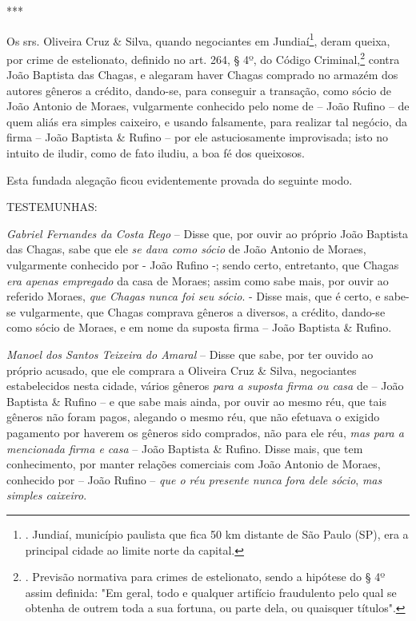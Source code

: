 ***

Os srs. Oliveira Cruz \& Silva, quando negociantes em Jundiaí\footnote{.
  Jundiaí, município paulista que fica 50 km distante de São Paulo (SP),
  era a principal cidade ao limite norte da capital.}, deram queixa, por
crime de estelionato, definido no art. 264, § 4º, do Código
Criminal,\footnote{. Previsão normativa para crimes de estelionato,
  sendo a hipótese do § 4º assim definida: "Em geral, todo e qualquer
  artifício fraudulento pelo qual se obtenha de outrem toda a sua
  fortuna, ou parte dela, ou quaisquer títulos".} contra João Baptista
das Chagas, e alegaram haver Chagas comprado no armazém dos autores
gêneros a crédito, dando-se, para conseguir a transação, como sócio de
João Antonio de Moraes, vulgarmente conhecido pelo nome de -- João
Rufino -- de quem aliás era simples caixeiro, e usando falsamente, para
realizar tal negócio, da firma -- João Baptista \& Rufino -- por ele
astuciosamente improvisada; isto no intuito de iludir, como de fato
iludiu, a boa fé dos queixosos.

Esta fundada alegação ficou evidentemente provada do seguinte modo.

TESTEMUNHAS:

\emph{Gabriel Fernandes da Costa Rego} -- Disse que, por ouvir ao
próprio João Baptista das Chagas, sabe que ele \emph{se dava como sócio}
de João Antonio de Moraes, vulgarmente conhecido por - João Rufino -;
sendo certo, entretanto, que Chagas \emph{era apenas empregado} da casa
de Moraes; assim como sabe mais, por ouvir ao referido Moraes, \emph{que
Chagas nunca foi seu sócio}. - Disse mais, que é certo, e sabe-se
vulgarmente, que Chagas comprava gêneros a diversos, a crédito, dando-se
como sócio de Moraes, e em nome da suposta firma -- João Baptista \&
Rufino.

\emph{Manoel dos Santos Teixeira do Amaral} -- Disse que sabe, por ter
ouvido ao próprio acusado, que ele comprara a Oliveira Cruz \& Silva,
negociantes estabelecidos nesta cidade, vários gêneros \emph{para a
suposta firma ou casa} de -- João Baptista \& Rufino -- e que sabe mais
ainda, por ouvir ao mesmo réu, que tais gêneros não foram pagos,
alegando o mesmo réu, que não efetuava o exigido pagamento por haverem
os gêneros sido comprados, não para ele réu, \emph{mas para a mencionada
firma e casa} -- João Baptista \& Rufino. Disse mais, que tem
conhecimento, por manter relações comerciais com João Antonio de Moraes,
conhecido por -- João Rufino -- \emph{que o réu presente nunca fora dele
sócio}, \emph{mas simples caixeiro}.

